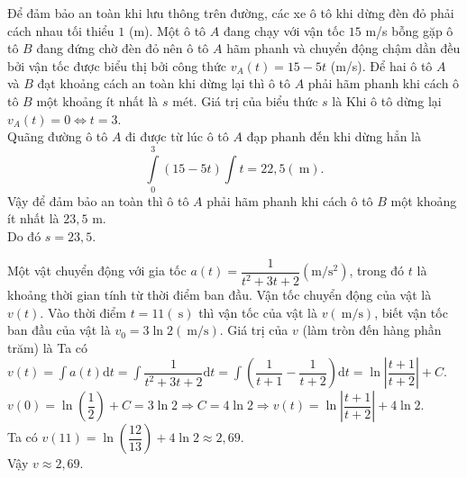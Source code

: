 \begin{ex}%
	Để đảm bảo an toàn khi lưu thông trên đường, các xe ô tô khi dừng đèn đỏ phải cách nhau tối thiểu $1$ (m). Một ô tô $A$ đang chạy với vận tốc $15$ m/s bỗng gặp ô tô $B$ đang đứng chờ đèn đỏ nên ô tô $A$ hãm phanh và chuyển động chậm dần đều bởi vận tốc được biểu thị bởi công thức $v_A(t)=15-5 t$ (m/s). Để hai ô tô $A$ và $B$ đạt khoảng cách an toàn khi dừng lại thì ô tô $A$ phải hãm phanh khi cách ô tô $B$ một khoảng ít nhất là $s$ mét. Giá trị của biểu thức $s$ là
	\loigiai
	{Khi ô tô dừng lại $v_A(t)=0 \Leftrightarrow t=3$.\\
		Quãng đường ô tô $A$ đi được từ lúc ô tô $A$ đạp phanh đến khi dừng hẳn là
		$$\displaystyle\int\limits_0^3(15-5 t)\displaystyle\int\limits t=22,5 (\mathrm{~m}).$$
		Vậy để đảm bảo an toàn thì ô tô $A$ phải hãm phanh khi cách ô tô $B$ một khoảng ít nhất là $23{,}5$ m.\\
		Do đó $s=23{,}5$.
	}
\end{ex}

\begin{ex}%
	Một vật chuyển động với gia tốc $a(t)=\dfrac{1}{t^2+3 t+2} \left(\mathrm{m} / \mathrm{s}^2\right)$, trong đó $t$ là khoảng thời gian tính từ thời điểm ban đầu. Vận tốc chuyển động của vật là $v(t)$. Vào thời điểm $t=11(\mathrm{~s})$ thì vận tốc của vật là $v(\mathrm{~m} / \mathrm{s})$, biết vận tốc ban đầu của vật là $v_0=3 \ln 2(\mathrm{~m} / \mathrm{s})$. Giá trị của $v$ (làm tròn đến hàng phần trăm) là
	\loigiai
	{Ta có $v(t)=\displaystyle\int\limits a(t) \mathrm{d}t=\displaystyle\int\limits\dfrac{1}{t^2+3 t+2} \mathrm{d}t=\displaystyle\int\limits\left(\dfrac{1}{t+1}-\dfrac{1}{t+2}\right) \mathrm{d}t=\ln \left|\dfrac{t+1}{t+2}\right|+C$.\\
		$v(0)=\ln \left(\dfrac{1}{2}\right)+C=3 \ln 2 \Rightarrow C=4 \ln 2 \Rightarrow v(t)=\ln \left|\dfrac{t+1}{t+2}\right|+4 \ln 2$.\\
		Ta có $v(11)=\ln \left(\dfrac{12}{13}\right)+4 \ln 2 \approx 2{,}69$.\\
		Vậy $v \approx 2{,}69$.
	}
\end{ex}

